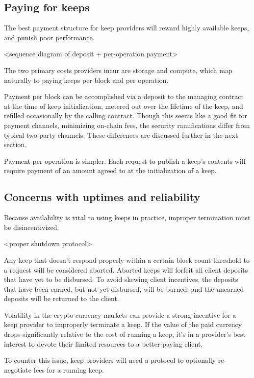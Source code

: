 \documentclass[11pt]{article}
\begin{document}
\subsection{Paying for keeps}

The best payment structure for keep providers will reward highly
available keeps, and punish poor performance.

<sequence diagram of deposit + per-operation payment>

The two primary costs providers incur are storage and compute, which
map naturally to paying keeps per block and per operation.

Payment per block can be accomplished via a deposit to the managing
contract at the time of keep initialization, metered out over the
lifetime of the keep, and refilled occasionally by the calling
contract. Though this seems like a good fit for payment channels,
minimizing on-chain fees, the security ramifications differ from
typical two-party channels. These differences are discussed further in
the next section.

Payment per operation is simpler. Each request to publish a keep’s
contents will require payment of an amount agreed to at the
initialization of a keep.

\subsection{Concerns with uptimes and reliability}

Because availability is vital to using keeps in practice, improper
termination must be disincentivized.

<proper shutdown protocol>

Any keep that doesn’t respond properly within a certain block count
threshold to a request will be considered aborted. Aborted keeps will
forfeit all client deposits that have yet to be disbursed. To avoid
skewing client incentives, the deposits that have been earned, but not
yet disbursed, will be burned, and the unearned deposits will be
returned to the client.

Volatility in the crypto currency markets can provide a strong
incentive for a keep provider to improperly terminate a keep. If the
value of the paid currency drops significantly relative to the cost of
running a keep, it’s in a provider’s best interest to devote their
limited resources to a better-paying client.

To counter this issue, keep providers will need a protocol to
optionally re-negotiate fees for a running keep.
\end{document}
